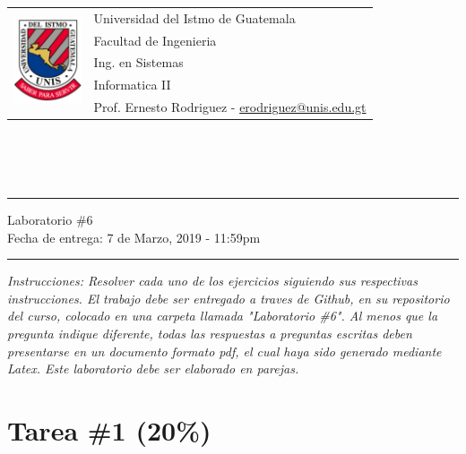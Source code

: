 \documentclass{article}
\newcommand{\horrule}[1]{\rule{\linewidth}{#1}}
\begin{document}
\begin{tabular}{l l}
\multirow{5}{*}{\includegraphics[width=2cm]{../../recursos/logo.png}} & Universidad del Istmo de Guatemala \\
 & Facultad de Ingenieria \\
 & Ing. en Sistemas \\
 & Informatica II \\
 & Prof. Ernesto Rodriguez - \href{mailto:erodriguez@unis.edu.gt}{erodriguez@unis.edu.gt} \\
\end{tabular}
\\\\\\

\begin{center}
        \horrule{0.5pt}
        \huge{Laboratorio \#6} \\
        \large{Fecha de entrega: 7 de Marzo, 2019 - 11:59pm} \\
        \horrule{1pt}
\end{center}

\emph{Instrucciones: Resolver cada uno de los ejercicios siguiendo sus respectivas
instrucciones. El trabajo debe ser entregado a traves de Github, en su repositorio del curso, colocado en una carpeta llamada "Laboratorio \#6".
Al menos que la pregunta indique diferente, todas las respuestas a preguntas escritas deben presentarse en
un documento formato pdf, el cual haya sido generado mediante Latex. Este laboratorio
debe ser elaborado en parejas.}

\section*{Tarea \#1 (20\%)}
\label{tarea1}
\end{document}
